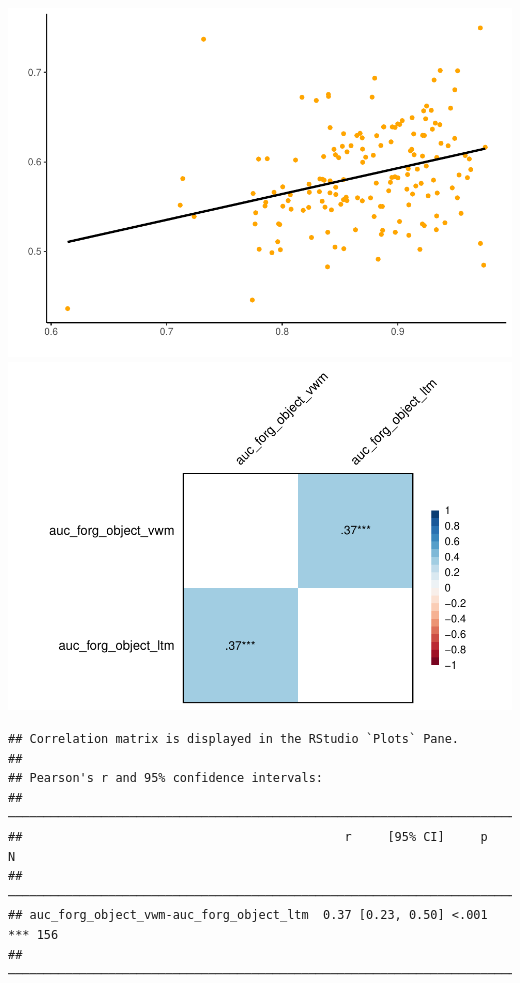 \documentclass[
  man]{apa6}
\begin{document}
\includegraphics{Script_Re_Greer_2023_group1Rock_2023_files/figure-latex/unnamed-chunk-4-1.pdf}
\includegraphics{Script_Re_Greer_2023_group1Rock_2023_files/figure-latex/unnamed-chunk-5-1.pdf}

\begin{verbatim}
## Correlation matrix is displayed in the RStudio `Plots` Pane.
## 
## Pearson's r and 95% confidence intervals:
## ────────────────────────────────────────────────────────────────────────
##                                             r     [95% CI]     p       N
## ────────────────────────────────────────────────────────────────────────
## auc_forg_object_vwm-auc_forg_object_ltm  0.37 [0.23, 0.50] <.001 *** 156
## ────────────────────────────────────────────────────────────────────────
\end{verbatim}
\end{document}

